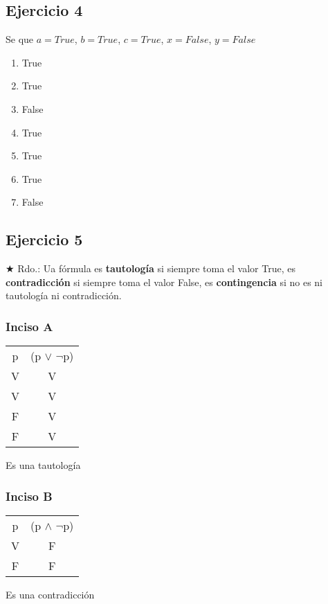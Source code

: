 \subsection{Ejercicio 4}
Se que $a = True$, $b = True$, $c = True$, $x = False$, $y = False$

\begin{enumerate}[label=(\alph*)]
    \item True
    \item True
    \item False
    \item True
    \item True
    \item True
    \item False
\end{enumerate}

\subsection{Ejercicio 5}
$\bigstar$ Rdo.: Ua fórmula es \textbf{tautología} si siempre toma el valor True, es \textbf{contradicción} si siempre toma el valor False,
es \textbf{contingencia} si no es ni tautología ni contradicción.

\subsubsection{Inciso A}
\begin{tabular}{c|c}
        p & (p $\vee$ $\neg$p) \\
        V & V               \\
        V & V               \\
        F & V               \\
        F & V
\end{tabular}

Es una tautología

\subsubsection{Inciso B}
\begin{tabular}{c|c}
        p & (p $\wedge$ $\neg$p) \\
        V & F               \\
        F & F
\end{tabular}

Es una contradicción

